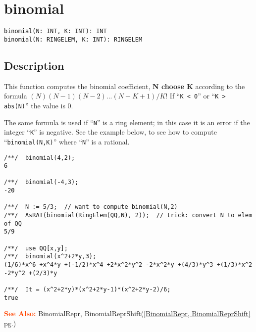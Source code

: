 \documentclass[a4paper]{mybook}
\newenvironment{command}{}{} %
\newcommand\SeeAlso{\par\textcolor{OrangeRed}{\textbf{\large See Also: }}}
\begin{document}
\section{binomial}
\label{binomial}
\begin{command} %


\begin{Verbatim}[label=syntax, rulecolor=\color{MidnightBlue},
frame=single]
binomial(N: INT, K: INT): INT
binomial(N: RINGELEM, K: INT): RINGELEM
\end{Verbatim}


\subsection*{Description}

This function computes the binomial coefficient, \textbf{N choose K}
according to the formula $(N)(N-1)(N-2)...(N-K+1) / K!$
If ``\verb&K < 0&'' or ``\verb&K > abs(N)&'' the value is 0.
\par 
The same formula is used if ``\verb&N&'' is a ring element; in this case it
is an error if the integer ``\verb&K&'' is negative.  See the example below, to
see how to compute ``\verb&binomial(N,K)&'' where ``\verb&N&'' is a rational.
\begin{Verbatim}[label=example, rulecolor=\color{PineGreen}, frame=single]
/**/  binomial(4,2);
6

/**/  binomial(-4,3);
-20

/**/  N := 5/3;  // want to compute binomial(N,2)
/**/  AsRAT(binomial(RingElem(QQ,N), 2));  // trick: convert N to elem of QQ
5/9

/**/  use QQ[x,y];
/**/  binomial(x^2+2*y,3);
(1/6)*x^6 +x^4*y +(-1/2)*x^4 +2*x^2*y^2 -2*x^2*y +(4/3)*y^3 +(1/3)*x^2 -2*y^2 +(2/3)*y

/**/  It = (x^2+2*y)*(x^2+2*y-1)*(x^2+2*y-2)/6;
true
\end{Verbatim}


\SeeAlso %
  BinomialRepr, BinomialReprShift(\ref{BinomialRepr, BinomialReprShift} pg.\pageref{BinomialRepr, BinomialReprShift})
\end{command} %
\end{document}
